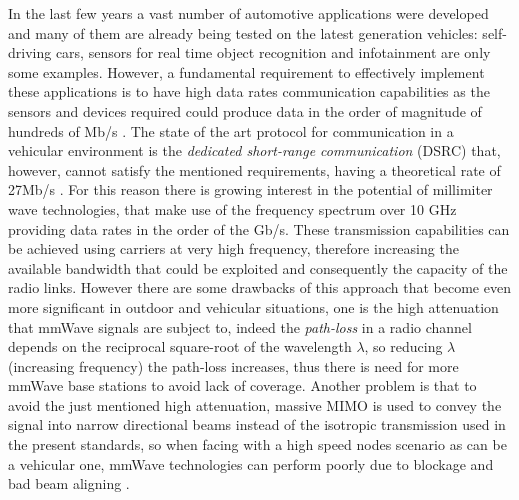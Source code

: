 \documentclass[conference,10pt]{IEEEtran}
\begin{document}
In the last few years a vast number of automotive applications were developed and many of them are already being tested on the latest generation vehicles: self-driving cars, sensors for real time object recognition and infotainment are only some examples. However, a fundamental requirement to effectively implement these applications is to have high data rates communication capabilities as the sensors and devices required could produce data in the order of magnitude of hundreds of Mb/s \cite{surveh}.
The state of the art protocol for communication in a vehicular environment is the \emph{dedicated short-range communication} (DSRC) that, however, cannot satisfy the mentioned requirements, having a theoretical rate of 27Mb/s \cite{surveh}. For this reason there is growing interest in the potential of millimiter wave technologies, that make use of the frequency spectrum over 10 GHz providing data rates in the order of the Gb/s. These transmission capabilities can be achieved using carriers at very high frequency, therefore increasing the available bandwidth that could be exploited and consequently the capacity of the radio links. However there are some drawbacks of this approach that become even more significant in outdoor and vehicular situations, one is the high attenuation that mmWave signals are subject to, indeed the \emph{path-loss} in a radio channel depends on the reciprocal square-root of the wavelength $\lambda$, so reducing $\lambda$ (increasing frequency) the path-loss increases, thus there is need for more mmWave base stations to avoid lack of coverage. Another problem is that to avoid the just mentioned high attenuation, massive MIMO is used to convey the signal into narrow directional beams instead of the isotropic transmission used in the present standards, so when facing with a high speed nodes scenario as can be a vehicular one, mmWave technologies can perform poorly due to blockage and bad beam aligning \cite{mmvehicle}.
\end{document}
